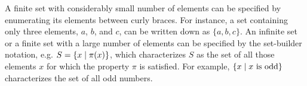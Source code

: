 A finite set with considerably small number of elements can be specified by
enumerating its elements between curly braces. For instance, a set containing
only three elements, $a$, $b$, and $c$, can be written down as $\{a, b, c\}$.
An infinite set or a finite set with a large number of elements can be
specified by the set-builder notation, e.g. $S = \{x \mathrel{|} \pi(x) \}$, which
characterizes $S$ as the set of all those elements $x$ for which the property
$\pi$ is satisfied. For example, $\{x \mathrel{|} \hbox{$x$ is odd}\}$ characterizes
the set of all odd numbers.
